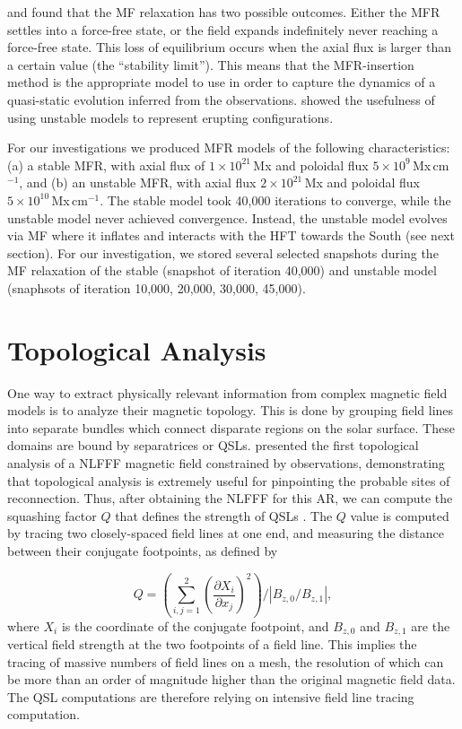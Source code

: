 \documentclass[preprint]{aastex}
\begin{document}
\citet{Bobra_etal_2008} and \citet{Su_etal_2011}  found that the MF relaxation has two possible outcomes. Either the MFR settles into a force-free state, or the field expands indefinitely  never reaching a force-free state. This loss of equilibrium occurs when the axial flux is larger than a certain value (the ``stability limit''). This means that the MFR-insertion method is the appropriate model to use in order to capture the dynamics of a quasi-static evolution inferred from the observations. \cite{Savcheva_etal_2015a, Savcheva_etal_2015b} showed the usefulness of using unstable models to represent erupting configurations. 

For our investigations we produced MFR models of the following characteristics: (a) a stable MFR, with axial flux of $1\times10^{21}$\,Mx and poloidal flux $5\times10^{9}$\,Mx\,cm$^{-1}$, and (b) an unstable MFR, with axial flux $2\times10^{21}$\,Mx and poloidal flux $5\times10^{10}$\,Mx\,cm$^{-1}$. The stable model took 40,000 iterations to converge, while the unstable model never achieved convergence. Instead, the unstable model evolves via MF where it inflates and interacts with the HFT towards the South (see next section). For our investigation, we stored several selected snapshots during the MF relaxation of the stable (snapshot of iteration 40,000) and unstable model (snaphsots of iteration 10,000, 20,000, 30,000, 45,000). 


\section{Topological Analysis}

One way to extract physically relevant information from complex magnetic field models is to analyze their magnetic topology. This is done by grouping field lines into separate bundles which connect disparate regions on the solar surface. These domains are bound by separatrices or QSLs. \citet{Savcheva_etal_2012b} presented the first topological analysis of a NLFFF magnetic field constrained by observations, demonstrating that topological analysis is extremely useful for pinpointing the probable sites of reconnection. Thus, after obtaining the NLFFF for this AR, we can compute the squashing factor $Q$ that defines the strength of QSLs \citep{Titov_etal_2002,titov07}. The $Q$ value is computed by tracing two closely-spaced field lines at one end, and measuring the distance between their conjugate footpoints, as defined by 

\begin{equation}
	Q=\left(\sum_{i,j=1}^2 \left(\frac{\partial X_i}{\partial x_j}\right)^2\right)/|B_{z,0}/B_{z,1}|, 
\end{equation}
where $X_i$ is the coordinate of the conjugate footpoint, and $B_{z,0}$ and $B_{z,1}$ are the vertical field strength at the two footpoints of a field line. This implies the tracing of massive numbers of field lines on a mesh, the resolution of which can be more than an order of magnitude higher than the original magnetic field data. The QSL computations are therefore relying on intensive field line tracing computation. 
\end{document}
